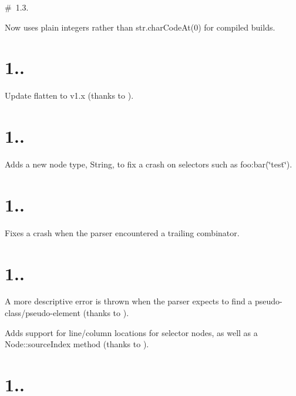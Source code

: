 \# 1.3.


\begin{DoxyItemize}
\item Now uses plain integers rather than {\ttfamily str.\+char\+Code\+At(0)} for compiled builds.
\end{DoxyItemize}

\section*{1..}


\begin{DoxyItemize}
\item Update flatten to v1.\+x (thanks to ).
\end{DoxyItemize}

\section*{1..}


\begin{DoxyItemize}
\item Adds a new node type, {\ttfamily String}, to fix a crash on selectors such as {\ttfamily foo\+:bar(\char`\"{}test\char`\"{})}.
\end{DoxyItemize}

\section*{1..}


\begin{DoxyItemize}
\item Fixes a crash when the parser encountered a trailing combinator.
\end{DoxyItemize}

\section*{1..}


\begin{DoxyItemize}
\item A more descriptive error is thrown when the parser expects to find a pseudo-\/class/pseudo-\/element (thanks to ).
\item Adds support for line/column locations for selector nodes, as well as a {\ttfamily Node\+::source\+Index} method (thanks to ).
\end{DoxyItemize}

\section*{1..}


